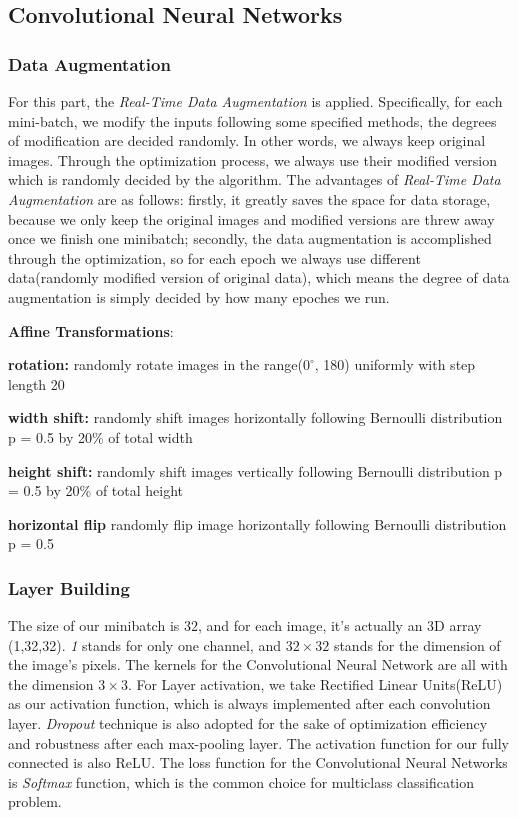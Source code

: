 \documentclass[paper=a4, fontsize=11pt]{scrartcl}
\begin{document}
\subsection*{Convolutional Neural Networks}
\subsubsection*{Data Augmentation}
For this part, the \textit{Real-Time Data Augmentation} is applied. Specifically, for each mini-batch, we modify the inputs following some specified methods, the degrees of modification are decided randomly. In other words, we always keep original images. Through the optimization process, we always use their modified version which is randomly decided by the algorithm. The advantages of \textit{Real-Time Data Augmentation} are as follows: firstly, it greatly saves the space for data storage, because we only keep the original images and modified versions are threw away once we finish one minibatch; secondly, the data augmentation is accomplished through the optimization, so for each epoch we always use different data(randomly modified version of original data), which means the degree of data augmentation is simply decided by how many epoches we run.

\textbf{Affine Transformations}:

\textbf{rotation:} randomly rotate images in the range($0^\circ$, 180\degree) uniformly with step length 20\degree

\textbf{width shift:} randomly shift images horizontally following Bernoulli distribution p = 0.5 by 20\% of total width

\textbf{height shift:} randomly shift images vertically following Bernoulli distribution p = 0.5 by 20\% of total height

\textbf{horizontal flip} randomly flip image horizontally following Bernoulli distribution p = 0.5

\subsubsection*{Layer Building}
The size of our minibatch is $32$, and for each image, it's actually an 3D array (1,32,32). \textit{1} stands for only one channel, and $32 \times 32$ stands for the dimension of the image's pixels.  The kernels for the Convolutional Neural Network are all with the dimension $3 \times 3$. For Layer activation, we take Rectified Linear Units(ReLU) as our activation function, which is always implemented after each convolution layer. \textit{Dropout} technique is also adopted for the sake of optimization efficiency and robustness after each max-pooling layer. The activation function for our fully connected is also ReLU. The loss function for the Convolutional Neural Networks is \textit{Softmax} function, which is the common choice for multiclass classification problem.
\end{document}
